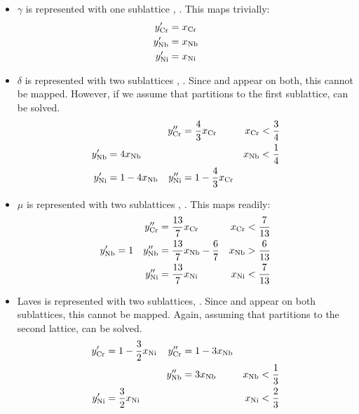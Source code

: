 \documentclass[10pt]{article}
\begin{document}
		\begin{itemize}
		\item $\gamma$ is represented with one sublattice \cite{Du2005}, .
			This maps trivially:
			\begin{align*}
				y_{\ce{Cr}}' &= x_{\ce{Cr}} & & & &\\
				y_{\ce{Nb}}' &= x_{\ce{Nb}} & & & &\\
				y_{\ce{Ni}}' &= x_{\ce{Ni}} & & & &
			\end{align*}
		
		\item $\delta$ is represented with two sublattices \cite{Du2005}, .
			Since  and  appear on both, this cannot be mapped.
			However, if we assume that  partitions to the first sublattice,
			 can be solved.
			\begin{align*}
				             &                   & y_{\ce{Cr}}'' &= \frac{4}{3}x_{\ce{Cr}}     & x_{\ce{Cr}}&<\frac{3}{4}\\
				y_{\ce{Nb}}' &= 4x_{\ce{Nb}}     &               &                             & x_{\ce{Nb}}&<\frac{1}{4}\\
				y_{\ce{Ni}}' &= 1 - 4x_{\ce{Nb}} & y_{\ce{Ni}}'' &= 1 - \frac{4}{3}x_{\ce{Cr}} &            &\\
			\end{align*}
		
		\item $\mu$ is represented with two sublattices \cite{Du2005}, .
			This maps readily:
			\begin{align*}
				             &    & y_{\ce{Cr}}'' &= \frac{13}{7}x_{\ce{Cr}}               & x_{\ce{Cr}}&<\frac{7}{13}\\
				y_{\ce{Nb}}' &= 1 & y_{\ce{Nb}}'' &= \frac{13}{7}x_{\ce{Nb}} - \frac{6}{7} & x_{\ce{Nb}}&>\frac{6}{13}\\
				             &    & y_{\ce{Ni}}'' &= \frac{13}{7}x_{\ce{Ni}}               & x_{\ce{Ni}}&<\frac{7}{13}
			\end{align*}
		
		\item Laves is represented with two sublattices, .
			Since  and  appear on both sublattices, this cannot be mapped.
			Again, assuming that  partitions to the second lattice,
			 can be solved.
			\begin{align*}
				y_{\ce{Cr}}' &= 1 - \frac{3}{2}x_{\ce{Ni}} & y_{\ce{Cr}}'' &= 1 - 3x_{\ce{Nb}} &             &\\
				             &                             & y_{\ce{Nb}}'' &= 3x_{\ce{Nb}}     & x_{\ce{Nb}} &< \frac{1}{3}\\
				y_{\ce{Ni}}' &= \frac{3}{2}x_{\ce{Ni}}     &               &                   & x_{\ce{Ni}} &< \frac{2}{3}\\
			\end{align*}
		\end{itemize}		
\end{document}
